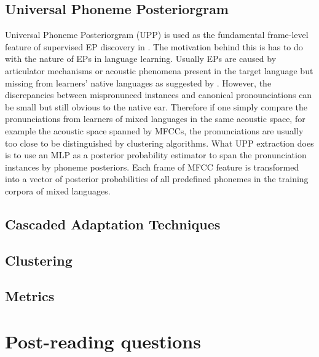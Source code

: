 \documentclass[nobib]{tufte-handout}
\begin{document}
\subsection{\textbf{Universal Phoneme Posteriorgram}}
\noindent Universal Phoneme Posteriorgram (UPP) is used as the fundamental frame-level feature of supervised EP discovery in \cite{wang2015supervised}. The motivation behind this is has to do with the nature of EPs in language learning. Usually EPs are caused by articulator mechanisms or acoustic phenomena present in the target language but missing from learners' native languages as suggested by \cite{wang2015supervised}. However, the discrepancies between mispronunced instances and canonical pronounciations can be small but still obvious to the native ear. Therefore if one simply compare the pronunciations from learners of mixed languages in the same acoustic space, for example the acoustic space spanned by MFCCs, the pronunciations are usually too close to be distinguished by clustering algorithms. What UPP extraction does is to use an MLP as a posterior probability estimator to span the pronunciation instances by phoneme posteriors. Each frame of MFCC feature is transformed into a vector of posterior probabilities of all predefined phonemes in the training corpora of mixed languages.
\subsection{Cascaded Adaptation Techniques}
\subsection{Clustering}
\subsection{Metrics}


\bigskip
\section{Post-reading questions}




\end{document}
